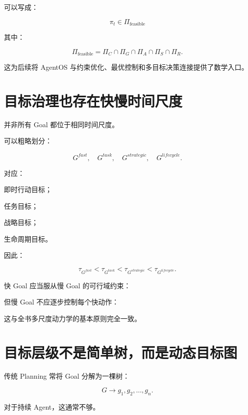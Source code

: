 可以写成：

\[
\pi_t
\in
\Pi_{\mathrm{feasible}}
\]

其中：

\[
\Pi_{\mathrm{feasible}}
=
\Pi_C
\cap
\Pi_G
\cap
\Pi_A
\cap
\Pi_S
\cap
\Pi_R.
\]

这为后续将 AgentOS 与约束优化、最优控制和多目标决策连接提供了数学入口。


\section{目标治理也存在快慢时间尺度}

并非所有 Goal 都位于相同时间尺度。

可以粗略划分：

\[
G^{fast},
\quad
G^{task},
\quad
G^{strategic},
\quad
G^{lifecycle}.
\]

对应：

即时行动目标；

任务目标；

战略目标；

生命周期目标。

因此：

\[
\tau_{G^{fast}}
<
\tau_{G^{task}}
<
\tau_{G^{strategic}}
<
\tau_{G^{lifecycle}}.
\]

快 Goal 应当服从慢 Goal 的可行域约束：

\begin{statementbox}
\centering
{}
\end{statementbox}

但慢 Goal 不应逐步控制每个快动作：

\begin{statementbox}
\centering
{}
\end{statementbox}

这与全书多尺度动力学的基本原则完全一致。


\section{目标层级不是简单树，而是动态目标图}

传统 Planning 常将 Goal 分解为一棵树：

\[
G
\rightarrow
g_1,g_2,\dots,g_n.
\]

对于持续 Agent，这通常不够。

